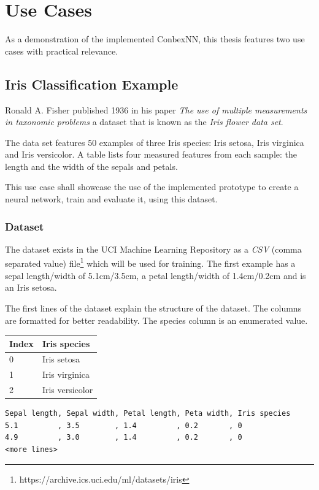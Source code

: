 \chapter{Use Cases}\label{use-cases}

As a demonstration of the implemented ConbexNN, this thesis features two
use cases with practical relevance.

\section{Iris Classification Example}\label{iris-classification-example}

Ronald A. Fisher published 1936 in his paper \emph{The use of multiple
measurements in taxonomic problems} \cite{fisher} a dataset that is
known as the \emph{Iris flower data set}.

The data set \cite{fisher} features 50 examples of three Iris species:
Iris setosa, Iris virginica and Iris versicolor. A table lists four
measured features from each sample: the length and the width of the
sepals and petals.

This use case shall showcase the use of the implemented prototype to
create a neural network, train and evaluate it, using this dataset.

\subsection{Dataset}\label{dataset}

The dataset exists in the UCI Machine Learning Repository
\cite{uci-iris} as a \emph{CSV} (comma separated value) file\footnote{https://archive.ics.uci.edu/ml/datasets/iris}
which will be used for training. The first example has a sepal
length/width of 5.1cm/3.5cm, a petal length/width of 1.4cm/0.2cm and is
an Iris setosa.

The first lines of the dataset explain the structure of the dataset. The
columns are formatted for better readability. The species column is an
enumerated value.

\begin{longtable}[]{@{}ll@{}}
\toprule
Index & Iris species\tabularnewline
\midrule
\endhead
0 & Iris setosa\tabularnewline
1 & Iris virginica\tabularnewline
2 & Iris versicolor\tabularnewline
\bottomrule
\end{longtable}

\begin{verbatim}
Sepal length, Sepal width, Petal length, Peta width, Iris species
5.1         , 3.5        , 1.4         , 0.2       , 0
4.9         , 3.0        , 1.4         , 0.2       , 0
<more lines>
\end{verbatim}

